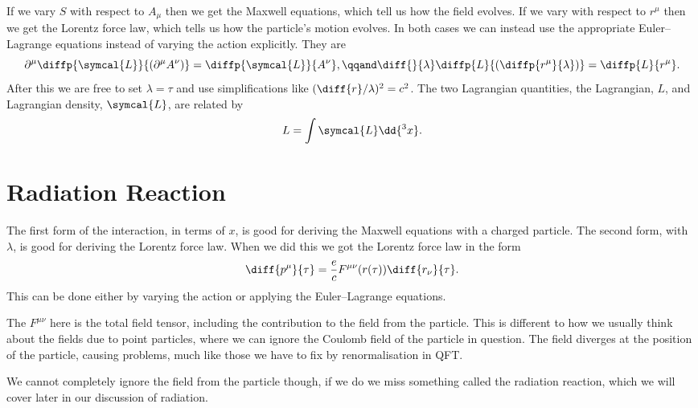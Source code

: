 \documentclass[fleqn]{NotesClass}
\newcommand*{\lagrangian}{L}
\newcommand*{\lagrangianDensity}{\symcal{L}}
\begin{document}
    If we vary \(S\) with respect to \(A_\mu\) then we get the Maxwell equations, which tell us how the field evolves.
    If we vary with respect to \(r^{\mu}\) then we get the Lorentz force law, which tells us how the particle's motion evolves.
    In both cases we can instead use the appropriate Euler--Lagrange equations instead of varying the action explicitly.
    They are
    \begin{equation}
        \partial^\mu \diffp{\lagrangianDensity}{(\partial^\mu A^\nu)} = \diffp{\lagrangianDensity}{A^\nu}, \qqand \diff{}{\lambda}\diffp{\lagrangian}{\left( \diffp{r^\mu}{\lambda} \right)} = \diffp{\lagrangian}{r^\mu}.
    \end{equation}
    After this we are free to set \(\lambda = \tau\) and use simplifications like \((\diff{r}/{\lambda})^2 = c^2\).
    The two Lagrangian quantities, the Lagrangian, \(\lagrangian\), and Lagrangian density, \(\lagrangianDensity\), are related by
    \begin{equation}
        \lagrangian = \int \lagrangianDensity \dd{^3x}.
    \end{equation}
    
    \section{Radiation Reaction}
    The first form of the interaction, in terms of \(x\), is good for deriving the Maxwell equations with a charged particle.
    The second form, with \(\lambda\), is good for deriving the Lorentz force law.
    When we did this we got the Lorentz force law in the form
    \begin{equation}
        \diff{p^\mu}{\tau} = \frac{e}{c} F^{\mu\nu}(r(\tau)) \diff{r_\nu}{\tau}.
    \end{equation}
    This can be done either by varying the action or applying the Euler--Lagrange equations.
    
    The \(F^{\mu\nu}\) here is the total field tensor, including the contribution to the field from the particle.
    This is different to how we usually think about the fields due to point particles, where we can ignore the Coulomb field of the particle in question.
    The field diverges at the position of the particle, causing problems, much like those we have to fix by renormalisation in QFT.
    
    We cannot completely ignore the field from the particle though, if we do we miss something called the radiation reaction, which we will cover later in our discussion of radiation.
    
\end{document}

